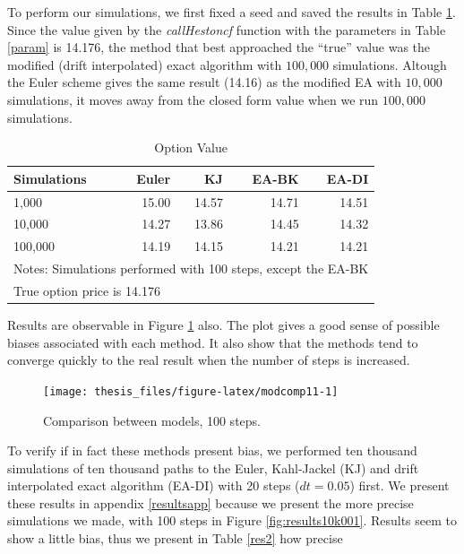 \documentclass[12pt,twoside]{reedthesis}
\theoremstyle{definition}
\theoremstyle{definition}
\theoremstyle{remark}
\begin{document}
  To perform our simulations, we first fixed a seed and saved the results
  in Table \ref{res}. Since the value given by the \emph{callHestoncf}
  function with the parameters in Table \ref{param} is 14.176, the method
  that best approached the ``true'' value was the modified (drift
  interpolated) exact algorithm with \(100,000\) simulations. Altough the
  Euler scheme gives the same result (14.16) as the modified EA with
  \(10,000\) simulations, it moves away from the closed form value when we
  run \(100,000\) simulations.
  \begin{table}[ht]
  \centering
  \begin{tabular}{lrrrr}
    \hline 
  Simulations & Euler & KJ & EA-BK & EA-DI \\ 
    \hline 
  1,000 & 15.00 & 14.57 & 14.71 & 14.51 \\ 
    10,000 & 14.27 & 13.86 & 14.45 & 14.32 \\ 
    100,000 & 14.19 & 14.15 & 14.21 & 14.21 \\ 
     \hline 
  \multicolumn{5}{l}{\scriptsize{Notes: Simulations performed with 100 steps, except the EA-BK}} \\ 
   \multicolumn{5}{l}{\hspace{0.8cm} \scriptsize{True option price is 14.176}} 
  \end{tabular}
  \caption{Option Value} 
  \label{res}
  \end{table}
  Results are observable in Figure \ref{fig:modcomp11} also. The plot
  gives a good sense of possible biases associated with each method. It
  also show that the methods tend to converge quickly to the real result
  when the number of steps is increased.
  \begin{figure}
  
  {\centering \texttt{[image: thesis\_files/figure-latex/modcomp11-1]} 
  
  }
  
  \caption{Comparison between models, 100 steps. \label{modcomp1}}\label{fig:modcomp11}
  \end{figure}
  To verify if in fact these methods present bias, we performed ten
  thousand simulations of ten thousand paths to the Euler, Kahl-Jackel
  (KJ) and drift interpolated exact algorithm (EA-DI) with 20 steps
  (\(dt = 0.05\)) first. We present these results in appendix
  \ref{resultsapp} because we present the more precise simulations we
  made, with 100 steps in Figure \ref{fig:results10k001}. Results seem to
  show a little bias, thus we present in Table \ref{res2} how precise
\end{document}

